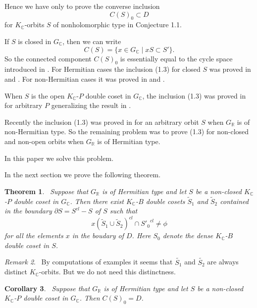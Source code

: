 \documentclass[12pt,a4paper]{amsart}
\newtheorem{theorem}{Theorem}[section]
\newtheorem{corollary}[theorem]{Corollary}
\theoremstyle{definition}
\theoremstyle{remark}
\newtheorem{remark}[theorem]{Remark}
\numberwithin{equation}{section}
\def\br{\mathbb R}
\def\bc{\mathbb C}
\def\p{\partial}
\begin{document}
Hence we have only to prove the converse inclusion
\begin{equation}
C(S)_0\subset D \tag{1.3}
\end{equation}
for $K_\bc$-orbits $S$ of nonholomorphic type in Conjecture 1.1.

If $S$ is closed in $G_\bc$, then we can write
$$C(S)=\{x\in G_\bc\mid xS\subset S'\}.$$
So the connected component $C(S)_0$ is essentially equal to the cycle space introduced in \cite{WW}. For Hermitian cases the inclusion (1.3) for closed $S$ was proved in \cite{WZ1} and \cite{WZ2}. For non-Hermitian cases it was proved in \cite{FH} and \cite{M8}.

When $S$ is the open $K_\bc$-$P$ double coset in $G_\bc$, the inclusion (1.3) was proved in \cite{M8} for arbitrary $P$ generalizing the result in \cite{B}.

Recently the inclusion (1.3) was proved in \cite{M9} for an arbitrary orbit $S$ when $G_\br$ is of non-Hermitian type. So the remaining problem was to prove (1.3) for non-closed and non-open orbits when $G_\br$ is of Hermitian type.

In this paper we solve this problem.

In the next section we prove the following theorem.

\begin{theorem} \ Suppose that $G_\br$ is of Hermitian type and let $S$ be a non-closed $K_\bc$-$P$ double coset in $G_\bc$. Then there exist $K_\bc$-$B$ double cosets $\widetilde{S}_1$ and $\widetilde{S}_2$ contained in the boundary $\p S=S^{cl}-S$ of $S$ such that
$$x(\widetilde{S}_1\cup \widetilde{S}_2)^{cl}\cap {S'_0}^{cl}\ne\phi$$
for all the elements $x$ in the boudary of $D$. Here $S_0$ denote the dense $K_\bc$-$B$ double coset in $S$.
\end{theorem}

\begin{remark} \ By computations of examples it seems that $\widetilde{S_1}$ and $\widetilde{S_2}$ are always distinct $K_\bc$-orbits. But we do not need this distinctness.
\end{remark}

\begin{corollary} \ Suppose that $G_\br$ is of Hermitian type and let $S$ be a non-closed $K_\bc$-$P$ double coset in $G_\bc$. Then $C(S)_0=D$.
\end{corollary}
\end{document}
